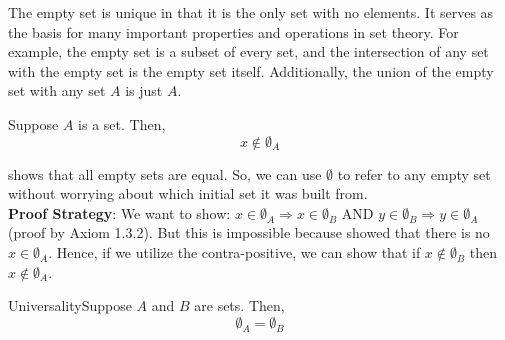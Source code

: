 The empty set is unique in that it is the only set with no elements. It serves as the basis for many important properties and operations in set theory. For example, the empty set is a subset of every set, and the intersection of any set with the empty set is the empty set itself. Additionally, the union of the empty set with any set \(A\) is just \(A\).


    \begin{exercise}
        {}Suppose \(A\) is a set. Then, \[x\notin \emptyset_A\]
    \end{exercise}




\begin{note}
    shows that all empty sets are equal. So, we can use \(\emptyset\) to refer to any empty set without worrying about which initial set it was built from. \\
    
    \textbf{Proof Strategy}: We want to show: \(x\in \emptyset_A \Rightarrow x\in \emptyset_B\) AND \(y \in \emptyset_B \Rightarrow y \in \emptyset_A\) (proof by Axiom 1.3.2). But this is impossible because  showed that there is no \(x\in \emptyset_A\). Hence, if we utilize the contra-positive, we can show that if \(x\notin \emptyset_B\) then \( x\notin \emptyset_A\).
\end{note}

\begin{exercise}
    {Universality}Suppose \(A\) and \(B\) are sets. Then, \[\emptyset_A = \emptyset_B\]
    \end{exercise}


